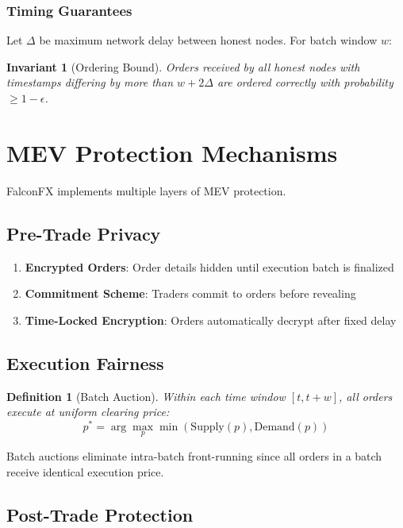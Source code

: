 \documentclass[11pt,a4paper]{article}
\newtheorem{definition}{Definition}
\newtheorem{invariant}{Invariant}
\begin{document}
\subsubsection{Timing Guarantees}

Let $\Delta$ be maximum network delay between honest nodes. For batch window $w$:

\begin{invariant}[Ordering Bound]
Orders received by all honest nodes with timestamps differing by more than $w + 2\Delta$ are ordered correctly with probability $\geq 1 - \epsilon$.
\end{invariant}

\section{MEV Protection Mechanisms}

FalconFX implements multiple layers of MEV protection.

\subsection{Pre-Trade Privacy}

\begin{enumerate}
    \item \textbf{Encrypted Orders}: Order details hidden until execution batch is finalized
    \item \textbf{Commitment Scheme}: Traders commit to orders before revealing
    \item \textbf{Time-Locked Encryption}: Orders automatically decrypt after fixed delay
\end{enumerate}

\subsection{Execution Fairness}

\begin{definition}[Batch Auction]
Within each time window $[t, t+w]$, all orders execute at uniform clearing price:
\begin{equation}
    p^* = \arg\max_p \min(\text{Supply}(p), \text{Demand}(p))
\end{equation}
\end{definition}

Batch auctions eliminate intra-batch front-running since all orders in a batch receive identical execution price.

\subsection{Post-Trade Protection}
\end{document}
